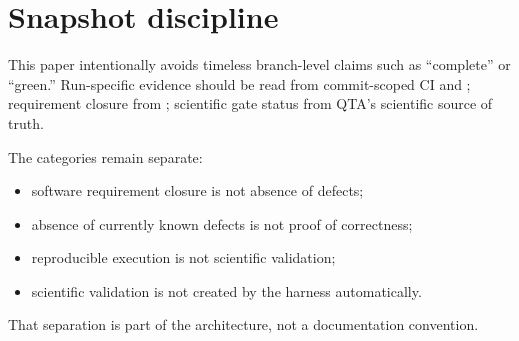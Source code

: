 \section{Snapshot discipline}
This paper intentionally avoids timeless branch-level claims such as ``complete'' or ``green.'' Run-specific evidence should be read from commit-scoped CI and ; requirement closure from ; scientific gate status from QTA's scientific source of truth.

The categories remain separate:
\begin{itemize}
  \item software requirement closure is not absence of defects;
  \item absence of currently known defects is not proof of correctness;
  \item reproducible execution is not scientific validation;
  \item scientific validation is not created by the harness automatically.
\end{itemize}

That separation is part of the architecture, not a documentation convention.

